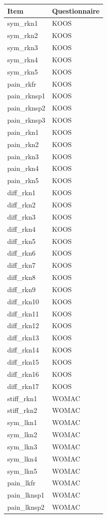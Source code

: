 \begin{tabular}{ll}\toprule
Item & Questionnaire\\\midrule
sym_rkn1 & KOOS \\
sym_rkn2 & KOOS \\
sym_rkn3 & KOOS \\
sym_rkn4 & KOOS \\
sym_rkn5 & KOOS \\
pain_rkfr & KOOS \\
pain_rknsp1 & KOOS \\
pain_rknsp2 & KOOS \\
pain_rknsp3 & KOOS \\
pain_rkn1 & KOOS \\
pain_rkn2 & KOOS \\
pain_rkn3 & KOOS \\
pain_rkn4 & KOOS \\
pain_rkn5 & KOOS \\
diff_rkn1 & KOOS \\
diff_rkn2 & KOOS \\
diff_rkn3 & KOOS \\
diff_rkn4 & KOOS \\
diff_rkn5 & KOOS \\
diff_rkn6 & KOOS \\
diff_rkn7 & KOOS \\
diff_rkn8 & KOOS \\
diff_rkn9 & KOOS \\
diff_rkn10 & KOOS \\
diff_rkn11 & KOOS \\
diff_rkn12 & KOOS \\
diff_rkn13 & KOOS \\
diff_rkn14 & KOOS \\
diff_rkn15 & KOOS \\
diff_rkn16 & KOOS \\
diff_rkn17 & KOOS \\
stiff_rkn1 & WOMAC \\
stiff_rkn2 & WOMAC \\
sym_lkn1 & WOMAC \\
sym_lkn2 & WOMAC \\
sym_lkn3 & WOMAC \\
sym_lkn4 & WOMAC \\
sym_lkn5 & WOMAC \\
pain_lkfr & WOMAC \\
pain_lknsp1 & WOMAC \\
pain_lknsp2 & WOMAC \\

\end{tabular}
